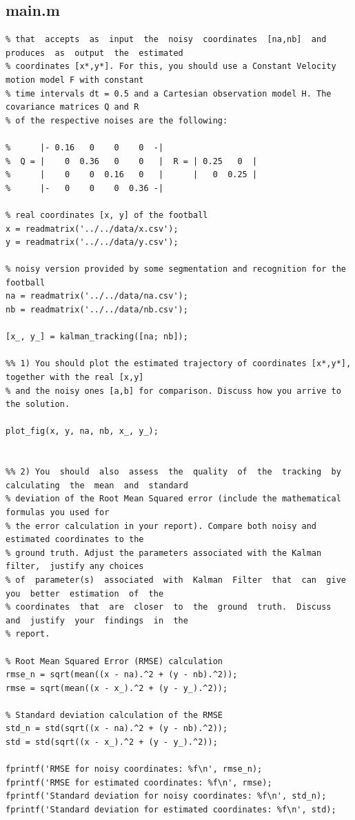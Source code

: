 \documentclass[conference]{IEEEtran}
\begin{document}
        \subsection{main.m}
            \begin{lstlisting}[style=Matlab-editor, basicstyle=\scriptsize]
%% Implement a Kalman filter from scratch (not using  any method/class from pre-built libraries) 
% that  accepts  as  input  the  noisy  coordinates  [na,nb]  and  produces  as  output  the  estimated 
% coordinates [x*,y*]. For this, you should use a Constant Velocity motion model F with constant 
% time intervals dt = 0.5 and a Cartesian observation model H. The covariance matrices Q and R 
% of the respective noises are the following:

%      |- 0.16   0    0    0  -|
%  Q = |    0  0.36   0    0   |  R = | 0.25   0  |
%      |    0    0  0.16   0   |      |   0  0.25 |
%      |-   0    0    0  0.36 -| 

% real coordinates [x, y] of the football
x = readmatrix('../../data/x.csv'); 
y = readmatrix('../../data/y.csv');

% noisy version provided by some segmentation and recognition for the football
na = readmatrix('../../data/na.csv');
nb = readmatrix('../../data/nb.csv');

[x_, y_] = kalman_tracking([na; nb]);

%% 1) You should plot the estimated trajectory of coordinates [x*,y*], together with the real [x,y] 
% and the noisy ones [a,b] for comparison. Discuss how you arrive to the solution.

plot_fig(x, y, na, nb, x_, y_);


%% 2) You  should  also  assess  the  quality  of  the  tracking  by  calculating  the  mean  and  standard 
% deviation of the Root Mean Squared error (include the mathematical formulas you used for 
% the error calculation in your report). Compare both noisy and estimated coordinates to the 
% ground truth. Adjust the parameters associated with the Kalman filter,  justify any choices 
% of  parameter(s)  associated  with  Kalman  Filter  that  can  give  you  better  estimation  of  the 
% coordinates  that  are  closer  to  the  ground  truth.  Discuss  and  justify  your  findings  in  the 
% report. 

% Root Mean Squared Error (RMSE) calculation
rmse_n = sqrt(mean((x - na).^2 + (y - nb).^2));
rmse = sqrt(mean((x - x_).^2 + (y - y_).^2));

% Standard deviation calculation of the RMSE
std_n = std(sqrt((x - na).^2 + (y - nb).^2));
std = std(sqrt((x - x_).^2 + (y - y_).^2));

fprintf('RMSE for noisy coordinates: %f\n', rmse_n);
fprintf('RMSE for estimated coordinates: %f\n', rmse);
fprintf('Standard deviation for noisy coordinates: %f\n', std_n);
fprintf('Standard deviation for estimated coordinates: %f\n', std);
            \end{lstlisting}
\end{document}
